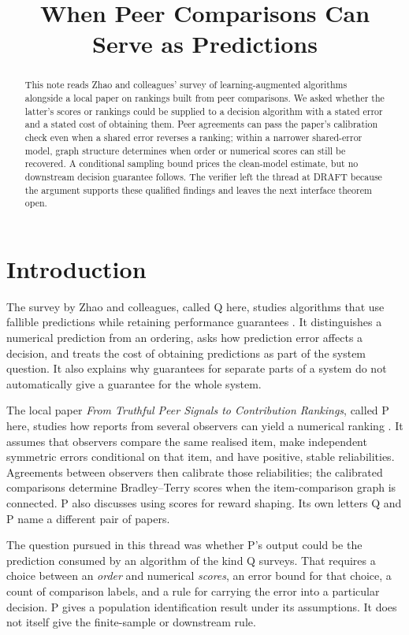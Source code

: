 \documentclass{article}
\title{When Peer Comparisons Can Serve as Predictions}
\begin{document}
\maketitle

\begin{abstract}
This note reads Zhao and colleagues' survey of learning-augmented algorithms alongside a local paper on
rankings built from peer comparisons. We asked whether the latter's scores or rankings could be supplied to a
decision algorithm with a stated error and a stated cost of obtaining them. Peer agreements can pass the
paper's calibration check even when a shared error reverses a ranking; within a narrower shared-error model,
graph structure determines when order or numerical scores can still be recovered. A conditional sampling bound
prices the clean-model estimate, but no downstream decision guarantee follows. The verifier left the thread at
DRAFT because the argument supports these qualified findings and leaves the next interface theorem open.
\end{abstract}

\section{Introduction}

The survey by Zhao and colleagues, called Q here, studies algorithms that use fallible predictions while
retaining performance guarantees \cite{Q}. It distinguishes a numerical prediction from an ordering, asks how
prediction error affects a decision, and treats the cost of obtaining predictions as part of the system
question. It also explains why guarantees for separate parts of a system do not automatically give a guarantee
for the whole system.

The local paper \emph{From Truthful Peer Signals to Contribution Rankings}, called P here, studies how reports
from several observers can yield a numerical ranking \cite{P}. It assumes that observers compare the same
realised item, make independent symmetric errors conditional on that item, and have positive, stable
reliabilities. Agreements between observers then calibrate those reliabilities; the calibrated comparisons
determine Bradley--Terry scores when the item-comparison graph is connected. P also discusses using scores for
reward shaping. Its own letters Q and P name a different pair of papers.

The question pursued in this thread was whether P's output could be the prediction consumed by an algorithm of
the kind Q surveys. That requires a choice between an \emph{order} and numerical \emph{scores}, an error bound
for that choice, a count of comparison labels, and a rule for carrying the error into a particular decision. P
gives a population identification result under its assumptions. It does not itself give the finite-sample or
downstream rule.
\end{document}
